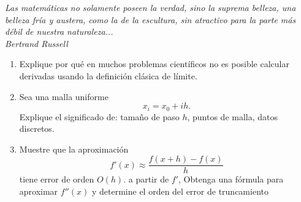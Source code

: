 \documentclass[11pt]{article}
\begin{document}
\it{Las matemáticas no solamente poseen la verdad, sino la suprema belleza, una belleza fría y austera, como la de la escultura, sin atractivo para la parte más débil de nuestra naturaleza... }\\ Bertrand Russell
\begin{enumerate}

\item Explique por qué en muchos problemas científicos no es posible calcular derivadas usando la definición clásica de límite.

\item Sea una malla uniforme
\[
x_i = x_0 + ih.
\]
Explique el significado de: tamaño de paso $h$,  puntos de malla, datos discretos.


\item Muestre que la aproximación
\[
f'(x) \approx \frac{f(x+h)-f(x)}{h}
\]
tiene error de orden $O(h)$. a partir de $f'$, Obtenga una fórmula para aproximar $f''(x)$ y determine el orden del error de truncamiento

\end{enumerate}
\end{document}
